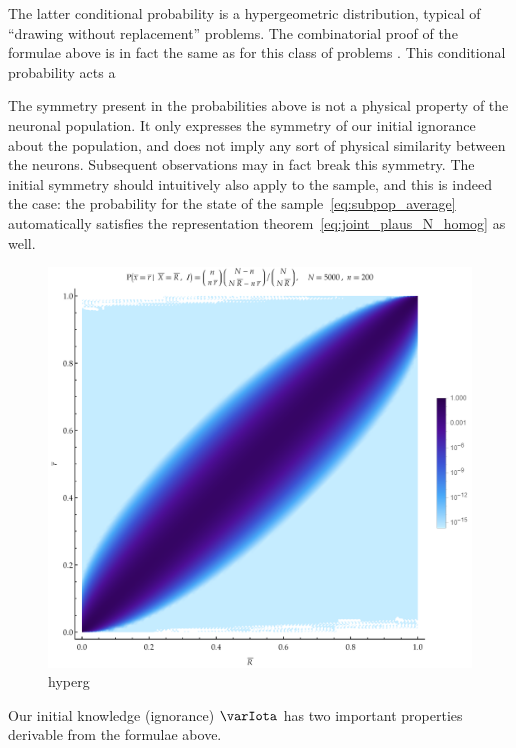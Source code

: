 \documentclass{article}
\theoremstyle{remark}
\theoremstyle{innote}
\renewcommand*{\|}{\mathpunct{|}}%
\newcommand*{\sect}{\S}%
\newcommand*{\chap}{ch.}%
\theoremstyle{simple}
\newcommand*{\yH}{\varIota}
\begin{document}
The latter conditional probability is a hypergeometric distribution,
typical of \enquote{drawing without replacement} problems. The
combinatorial proof of the formulae above is in fact the same as for this
class of problems
\cites[\chap~3]{jaynes1994_r2003}[\sect~4.8.3]{ross1976_r2010}[\sect~II.6]{feller1950_r1968}.
This conditional probability acts a




The symmetry present in the probabilities above is not a physical property
of the neuronal population. It only expresses the symmetry of our initial
ignorance about the population, and does not imply any sort of physical
similarity between the neurons. Subsequent observations may in fact break
this symmetry. The initial symmetry should intuitively also apply to the
sample, and this is indeed the case: the probability for the state of the
sample~\eqref{eq:subpop_average} automatically satisfies the representation
theorem~\eqref{eq:joint_plaus_N_homog} as well.

\begin{figure}[!t]
\centering
\includegraphics[width=0.99\linewidth]{pop_sample_projection2.pdf}%
\caption{hyperg}
\label{fig:hypergeom_proj}
\end{figure}%
Our initial knowledge (ignorance) $\yH$ has two important properties
derivable from the formulae above.
\end{document}
